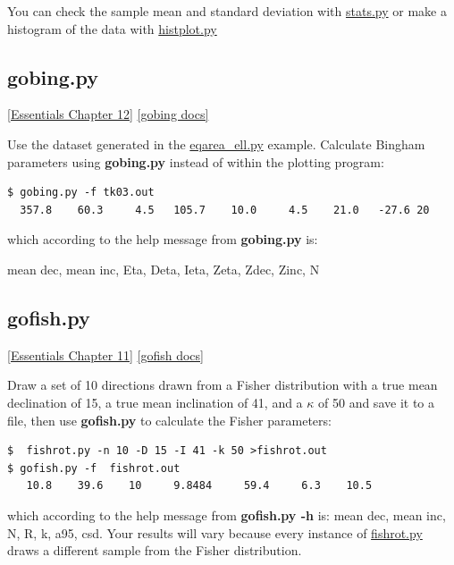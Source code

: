 \documentclass[11pt]{book}
\begin{document}
{{You can check the sample mean and standard deviation with \href{#stats.py}{stats.py} or make a histogram of the data with \href{#hisplot.py}{histplot.py}




\subsection{gobing.py}
 \href{http://earthref.org/MAGIC/books/Tauxe/Essentials/WebBook3ch11.html#ch11}{[Essentials Chapter 12]}
 \href{https://github.com/PmagPy/PmagPy/blob/master/programs/gobing.py}{[gobing docs]}

Use the dataset generated in the \href{#eqarea_ell.py}{eqarea\_ell.py} example.   Calculate Bingham parameters using {\bf gobing.py}  instead of within the plotting program:

\begin{verbatim}
$ gobing.py -f tk03.out
  357.8    60.3     4.5   105.7    10.0     4.5    21.0   -27.6 20
\end{verbatim}

\noindent  which according to the help message from {\bf gobing.py} is:

mean dec, mean inc, Eta, Deta, Ieta, Zeta, Zdec, Zinc, N


\subsection{gofish.py}
 \href{http://earthref.org/MAGIC/books/Tauxe/Essentials/WebBook3ch11.html#ch11}{[Essentials Chapter 11]}
 \href{https://github.com/PmagPy/PmagPy/blob/master/programs/gofish.py}{[gofish docs]}

 Draw a set of 10 directions drawn  from a Fisher distribution with a true mean declination of 15, a true mean inclination of 41, and a $\kappa$ of  50 and save it to a file, then use {\bf gofish.py} to calculate the Fisher parameters:

\begin{verbatim}
$  fishrot.py -n 10 -D 15 -I 41 -k 50 >fishrot.out
$ gofish.py -f  fishrot.out
   10.8    39.6    10     9.8484     59.4     6.3    10.5
\end{verbatim}

\noindent     which according to the help message from {\bf gofish.py -h} is:   mean dec, mean inc, N, R, k, a95, csd.  Your results will vary because every instance of \href{#fishrot.py}{fishrot.py} draws a different sample from the Fisher distribution.

}}
\end{document}
